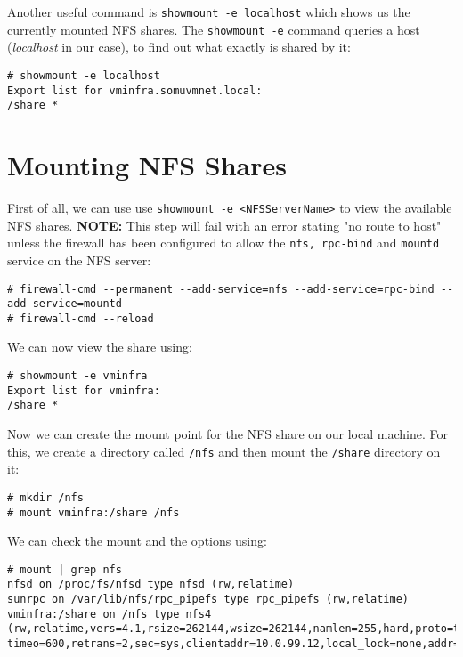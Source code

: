 Another useful command is \verb|showmount -e localhost| which shows us the currently mounted NFS shares. The \verb|showmount -e| command queries a host (\textit{localhost} in our case), to find out what exactly is shared by it:

\vspace{-15pt}
\begin{verbatim}
# showmount -e localhost
Export list for vminfra.somuvmnet.local:
/share *
\end{verbatim}
\vspace{-10pt}	

\section{Mounting NFS Shares}
First of all, we can use use \verb|showmount -e <NFSServerName>| to view the available NFS shares. \textbf{NOTE:} This step will fail with an error stating "no route to host" unless the firewall has been configured to allow the \verb|nfs, rpc-bind| and \verb|mountd| service on the NFS server:

\vspace{-15pt}
\begin{verbatim}
# firewall-cmd --permanent --add-service=nfs --add-service=rpc-bind --add-service=mountd
# firewall-cmd --reload
\end{verbatim}
\vspace{-10pt}	

\noindent
We can now view the share using:

\vspace{-15pt}
\begin{verbatim}
# showmount -e vminfra
Export list for vminfra:
/share *
\end{verbatim}
\vspace{-10pt}	

\noindent
Now we can create the mount point for the NFS share on our local machine. For this, we create a directory called \verb|/nfs| and then mount the \verb|/share| directory on it:

\vspace{-15pt}
\begin{verbatim}
# mkdir /nfs
# mount vminfra:/share /nfs
\end{verbatim}
\vspace{-10pt}	

\noindent
We can check the mount and the options using:

\vspace{-15pt}
\begin{verbatim}
# mount | grep nfs
nfsd on /proc/fs/nfsd type nfsd (rw,relatime)
sunrpc on /var/lib/nfs/rpc_pipefs type rpc_pipefs (rw,relatime)
vminfra:/share on /nfs type nfs4 (rw,relatime,vers=4.1,rsize=262144,wsize=262144,namlen=255,hard,proto=tcp,port=0, timeo=600,retrans=2,sec=sys,clientaddr=10.0.99.12,local_lock=none,addr=10.0.99.99)
\end{verbatim}

